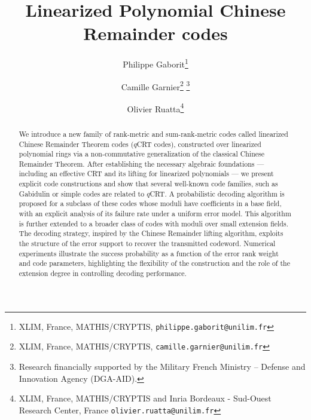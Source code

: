 \documentclass{article}
\author{
      Philippe Gaborit\thanks{XLIM, France, MATHIS/CRYPTIS, \texttt{philippe.gaborit@unilim.fr}} \\
      \and
      Camille Garnier\thanks{XLIM, France, MATHIS/CRYPTIS, \texttt{camille.garnier@unilim.fr}} \thanks{Research financially supported by the Military French Ministry – Defense and Innovation Agency (DGA-AID).}\\
      \and
      Olivier Ruatta\thanks{XLIM, France, MATHIS/CRYPTIS and Inria Bordeaux - Sud-Ouest Research Center, France \texttt{olivier.ruatta@unilim.fr}}
}
\theoremstyle{definition}
\begin{document}
\title{Linearized Polynomial Chinese Remainder codes}







\maketitle

\begin{abstract}

We introduce a new family of rank-metric and sum-rank-metric codes called linearized Chinese Remainder Theorem codes ($q$CRT codes), constructed over linearized polynomial rings via a non-commutative generalization of the classical Chinese Remainder Theorem. After establishing the necessary algebraic foundations — including an effective CRT and its lifting for linearized polynomials — we present explicit code constructions and show that several well-known code families, such as Gabidulin or simple codes are related to $q$CRT. A probabilistic decoding algorithm is proposed for a subclass of these codes whose moduli have coefficients in a base field, with an explicit analysis of its failure rate under a uniform error model. This algorithm is further extended to a broader class of codes with moduli over small extension fields. The decoding strategy, inspired by the Chinese Remainder lifting algorithm, exploits the structure of the error support to recover the transmitted codeword. Numerical experiments illustrate the success probability as a function of the error rank weight and code parameters, highlighting the flexibility of the construction and the role of the extension degree in controlling decoding performance.
\end{abstract}
\end{document}
